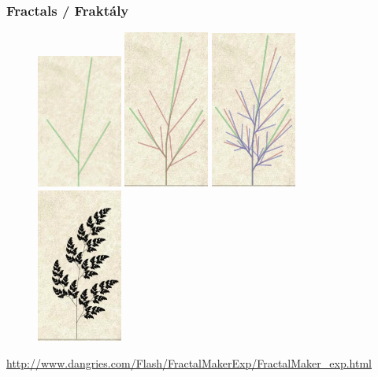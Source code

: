 \begin{frame}\frametitle{Fractals / Fraktály}
	\begin{figure}[h]
		\includegraphics[width=2.8cm,keepaspectratio]{pics/procedural/weed0.jpg}
		\includegraphics[width=2.8cm,keepaspectratio]{pics/procedural/weed1.jpg}
		\includegraphics[width=2.8cm,keepaspectratio]{pics/procedural/weed2.jpg}
		\includegraphics[width=2.8cm,keepaspectratio]{pics/procedural/weed3.jpg}
	\end{figure}
	\url{http://www.dangries.com/Flash/FractalMakerExp/FractalMaker_exp.html}
\end{frame}

